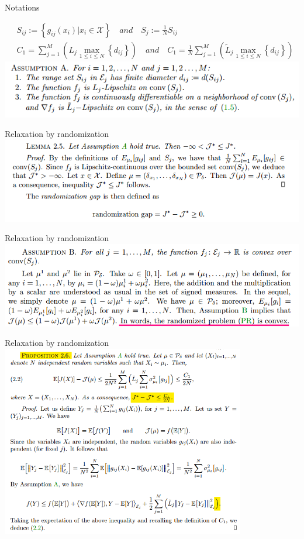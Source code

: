 \documentclass{beamer}
\begin{document}
\begin{frame}{Notations}

	\begin{align}
		& S_{ij}:=\left\{g_{ij}(x_i)|x_i\in \mathcal{X}\right\} \quad and\quad S_j:=\frac{1}{N}S_{ij}\nonumber \\
		&C_1 = \sum_{j=1}^{M}\left(L_j \mathop{max}\limits_{1\le i \le N} \left\{d_{ij}\right\}\right) \quad and \quad C_1 = \frac{1}{N}\sum_{j=1}^{M}\left(\widetilde{L}_j \mathop{max}\limits_{1\le i \le N} \left\{d_{ij}\right\}\right) \nonumber
	\end{align}
		\includegraphics[width=\textwidth]{kde/0.png}
\end{frame}



\begin{frame}{Relaxation by randomization}
	\includegraphics[width=\textwidth]{kde/1.png}
\end{frame}

\begin{frame}{Relaxation by randomization}
	\includegraphics[width=\textwidth]{kde/18.png}
\end{frame}

\begin{frame}{Relaxation by randomization}
	\includegraphics[width=0.8\textwidth]{kde/2.png}
\end{frame}
\end{document}
